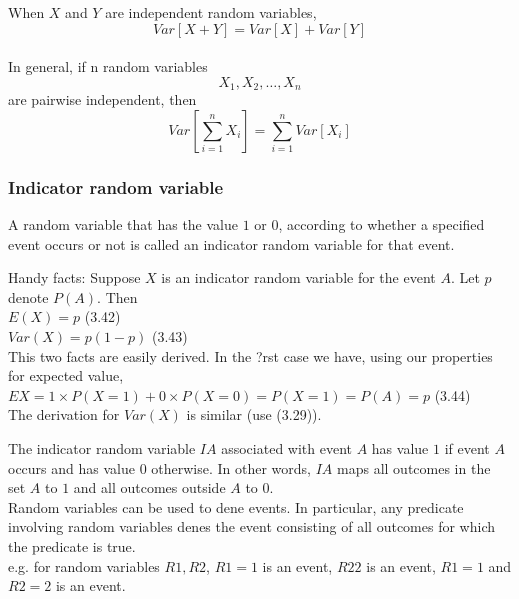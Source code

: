 \documentclass{article}
\begin{document}
When $X$ and $Y$ are independent random variables,\\
$$Var[X+Y]=Var[X] + Var[Y]$$\\
In general, if n random variables $$X_1, X_2, \ldots, X_n$$ are pairwise independent, then
$$Var[\sum_{i=1}^n X_i]= \sum_{i=1}^n Var[X_i]$$

\subsubsection{Indicator random variable}
A random variable that has the value $1$ or $0$, according to whether a specified event occurs or
not is called an indicator random variable for that event.

Handy facts: Suppose $X$ is an indicator random variable for the event $A$. Let $p$ denote $P(A)$.
Then\\
$E(X) = p$ (3.42)\\
$Var(X) = p(1 - p)$ (3.43)\\
This two facts are easily derived. In the ?rst case we have, using our properties for expected value,\\
$EX = 1 \times P(X = 1) + 0 \times P(X = 0) = P(X = 1) = P(A) = p$ (3.44)\\
The derivation for $Var(X)$ is similar (use (3.29)).

The indicator random variable $IA$ associated with event $A$ has value $1$ if event $A$ occurs and has value $0$ otherwise. In other words, $IA$ maps all outcomes in the set $A$ to $1$ and all outcomes outside $A$ to $0$.\\
Random variables can be used to dene events. In particular, any predicate involving
random variables denes the event consisting of all outcomes for which the predicate is true.\\
e.g. for random variables $R1, R2$, $R1 = 1$ is an event, $R2  2$ is an event, $R1 = 1$ and $R2 = 2$ is an event.
\end{document}
